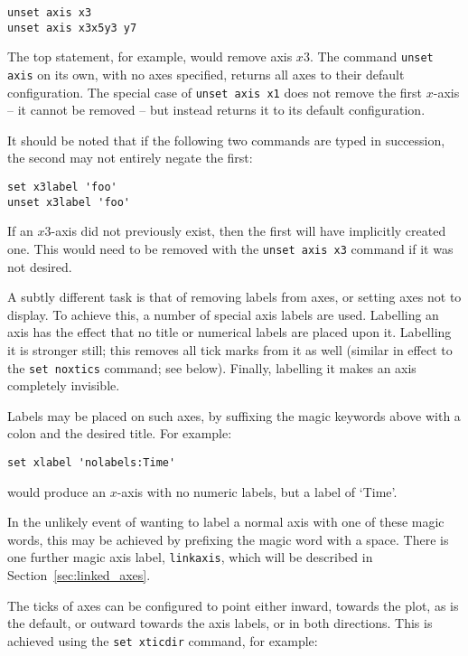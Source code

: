 \begin{verbatim}
unset axis x3
unset axis x3x5y3 y7
\end{verbatim}

\noindent The top statement, for example, would remove axis $x3$. The command
{\tt unset axis} on its own, with no axes specified, returns all axes to
their default configuration.  The special case of {\tt unset axis x1} does
not remove the first $x$-axis -- it cannot be removed -- but instead returns it
to its default configuration.

It should be noted that if the following two commands are typed in succession,
the second may not entirely negate the first:

\begin{verbatim}
set x3label 'foo'
unset x3label 'foo'
\end{verbatim}

\noindent If an $x3$-axis did not previously exist, then the first will have
implicitly created one. This would need to be removed with the {\tt unset axis
x3} command if it was not desired.

A subtly different task is that of removing labels from axes, or setting axes
not to display. To achieve this, a number of special axis labels are used.
Labelling an axis  has the effect that no title or numerical
labels are placed upon it. Labelling it  is stronger
still; this removes all tick marks from it as well (similar in effect to the
{\tt set noxtics} command; see below).  Finally, labelling it
 makes an axis completely invisible.

Labels may be placed on such axes, by suffixing the magic keywords above with a
colon and the desired title. For example:

\begin{verbatim}
set xlabel 'nolabels:Time'
\end{verbatim}

\noindent would produce an $x$-axis with no numeric labels, but a label of
`Time'.

In the unlikely event of wanting to label a normal axis with one of these magic
words, this may be
achieved by prefixing the magic word with a space. There is one further magic
axis label, {\tt linkaxis}, which will be described in
Section~\ref{sec:linked_axes}.

The ticks of axes can be configured to point either inward, towards the plot,
as is the default, or outward towards the axis labels, or in both directions.
This is achieved using the {\tt set xticdir} command, for example:

